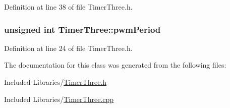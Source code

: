 \-Definition at line 38 of file \-Timer\-Three.\-h.

\hypertarget{class_timer_three_ad0b8c2a4aeb60ee88ee07c444946d70c}{
\subsubsection[{pwm\-Period}]{\setlength{\rightskip}{0pt plus 5cm}unsigned int {\bf \-Timer\-Three\-::pwm\-Period}}}\label{class_timer_three_ad0b8c2a4aeb60ee88ee07c444946d70c}


\-Definition at line 24 of file \-Timer\-Three.\-h.



\-The documentation for this class was generated from the following files\-:\begin{DoxyCompactItemize}
\item 
\-Included Libraries/\hyperlink{_timer_three_8h}{\-Timer\-Three.\-h}\item 
\-Included Libraries/\hyperlink{_timer_three_8cpp}{\-Timer\-Three.\-cpp}\end{DoxyCompactItemize}
